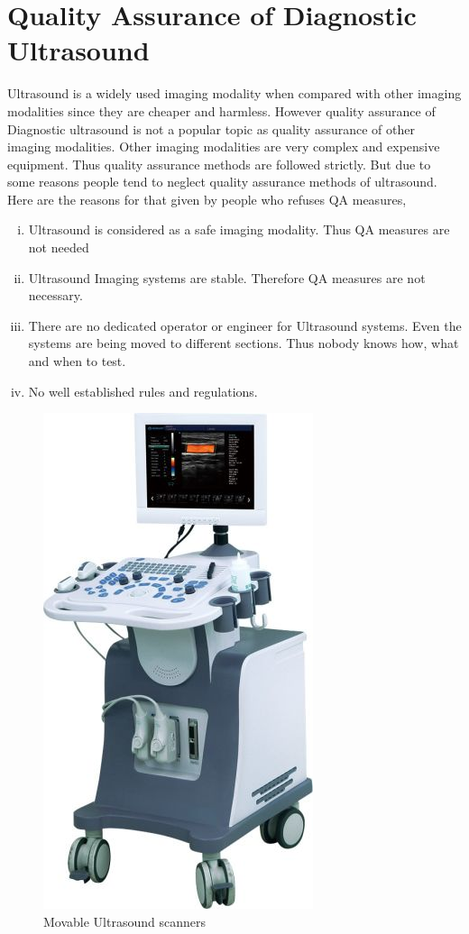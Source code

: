 \documentclass[12pt]{article}
\def \topic{Diagnostic Ultrasound}
\begin{document}

\pagebreak
\section{Quality Assurance of \topic}
Ultrasound is a widely used imaging modality when compared with other imaging modalities since they are cheaper and harmless. However quality assurance of Diagnostic ultrasound is not a popular topic as quality assurance of other imaging modalities. Other imaging modalities are very complex and expensive equipment. Thus quality assurance methods are followed strictly. But due to some reasons people tend to neglect quality assurance methods of ultrasound. Here are the reasons for that given by people who refuses QA measures,

\begin{enumerate}[i.]
    \item Ultrasound is considered as a safe imaging modality. Thus QA measures are not needed
    \item Ultrasound Imaging systems are stable. Therefore QA measures are not necessary. 
    \item There are no dedicated operator or engineer for Ultrasound systems. Even the systems are being moved to different sections. Thus nobody knows how, what and when to test.
    \item No well established rules and regulations. 
\end{enumerate}

\begin{figure}[h!]
    \centering
    \includegraphics[width=0.35\linewidth]{u4.jpg}
    \caption{\small{Movable Ultrasound scanners}}
    \label{fig:Movable Ultrasound scanners}
\end{figure}
\end{document}
